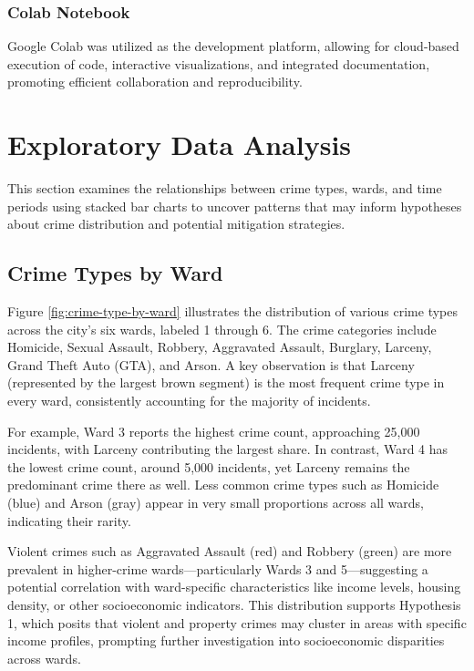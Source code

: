 \documentclass{report}
\begin{document}
\subsection{Colab Notebook}
Google Colab was utilized as the development platform, allowing for cloud-based execution of code, interactive visualizations, and integrated documentation, promoting efficient collaboration and reproducibility.

\chapter{Exploratory Data Analysis}

\par This section examines the relationships between crime types, wards, and time periods using stacked bar charts to uncover patterns that may inform hypotheses about crime distribution and potential mitigation strategies.

\section{Crime Types by Ward}
\par  Figure \ref{fig:crime-type-by-ward} illustrates the distribution of various crime types across the city’s six wards, labeled 1 through 6. The crime categories include Homicide, Sexual Assault, Robbery, Aggravated Assault, Burglary, Larceny, Grand Theft Auto (GTA), and Arson. A key observation is that Larceny (represented by the largest brown segment) is the most frequent crime type in every ward, consistently accounting for the majority of incidents.

For example, Ward 3 reports the highest crime count, approaching 25,000 incidents, with Larceny contributing the largest share. In contrast, Ward 4 has the lowest crime count, around 5,000 incidents, yet Larceny remains the predominant crime there as well. Less common crime types such as Homicide (blue) and Arson (gray) appear in very small proportions across all wards, indicating their rarity.

Violent crimes such as Aggravated Assault (red) and Robbery (green) are more prevalent in higher-crime wards—particularly Wards 3 and 5—suggesting a potential correlation with ward-specific characteristics like income levels, housing density, or other socioeconomic indicators. This distribution supports Hypothesis 1, which posits that violent and property crimes may cluster in areas with specific income profiles, prompting further investigation into socioeconomic disparities across wards.
\end{document}
